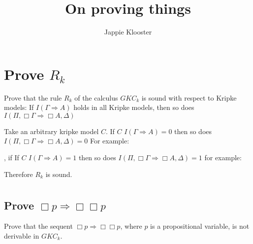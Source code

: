 \documentclass{article}
\begin{document}
\author{Jappie Klooster}
\title{On proving things}
\maketitle

\section{Prove $R_k$}
Prove that the rule $R_k$ of the calculus $GKC_k$ is sound with respect to
Kripke models: If $I(\Gamma \Rightarrow A)$ holds in all Kripke models, then
so does $I(\Pi, \Box \Gamma \Rightarrow \Box A, \Delta)$

\begin{prooftree}
\end{prooftree}

Take an arbitrary kripke model $C$. If $C$ $I(\Gamma \Rightarrow A)=0$ then
so does $I(\Pi, \Box \Gamma \Rightarrow \Box A, \Delta) = 0$ For example:



, if
 If $C$ $I(\Gamma \Rightarrow A)=1$ then
so does $I(\Pi, \Box \Gamma \Rightarrow \Box A, \Delta) = 1$ for example:

Therefore $R_k$ is sound.


\section{}
\subsection{Prove $\Box p \Rightarrow \Box \Box p$}
Prove that the sequent $\Box p \Rightarrow \Box \Box p$, where $p$ is a
propositional variable, is not derivable in $GKC_k$.
\end{document}
